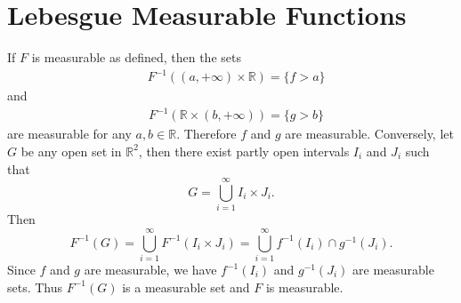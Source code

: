 \section{Lebesgue Measurable Functions}

\begin{exercise}{4.3}
  If $F$ is measurable as defined, then the sets
  \begin{align*}
    &F^{-1}((a,+\infty)\times\mathbb{R})=\{f>a\}
  \end{align*}
  and
  \begin{align*}
    &F^{-1}(\mathbb{R}\times(b,+\infty))=\{g>b\}
  \end{align*}
  are measurable for any $a,b\in\mathbb{R}.$
  Therefore $f$ and $g$ are measurable.
  Conversely, let $G$ be any open set in $\mathbb{R}^2$,
  then there exist partly open intervals $I_i$ and $J_i$ such that
  \[G=\bigcup_{i=1}^\infty I_i\times J_i.\]
  Then \[F^{-1}(G)=\bigcup_{i=1}^\infty F^{-1}(I_i\times J_i)=\bigcup_{i=1}^\infty f^{-1}(I_i)\cap g^{-1}(J_i).\]
  Since $f$ and $g$ are measurable,
  we have $f^{-1}(I_i)$ and $g^{-1}(J_i)$ are measurable sets.
  Thus $F^{-1}(G)$ is a measurable set and $F$ is measurable.
\end{exercise}

